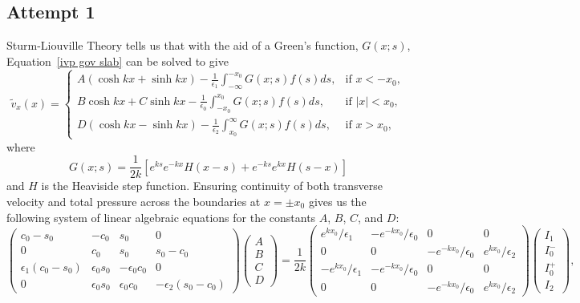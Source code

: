 \documentclass{aastex61}
\begin{document}
\subsection{Attempt 1}
Sturm-Liouville Theory tells us that with the aid of a Green's function, $G(x;s)$, Equation~\eqref{ivp gov slab} can be solved to give
\begin{equation}
\tilde{v}_x(x) =
\begin{cases}
A(\cosh{kx} + \sinh{kx}) - \frac{1}{\epsilon_1} \int_{-\infty}^{-x_0} G(x;s)f(s)ds, & \text{if  } x<-x_0,\\
B\cosh{kx} + C\sinh{kx} - \frac{1}{\epsilon_0} \int_{-x_0}^{x_0} G(x;s)f(s)ds, & \text{if  } |x|<x_0,\\
D(\cosh{kx} - \sinh{kx}) - \frac{1}{\epsilon_2} \int_{x_0}^{\infty} G(x;s)f(s)ds, & \text{if  } x>x_0,
\end{cases}
\label{ivp slab sol}
\end{equation}
where
\begin{equation}
G(x;s) = \frac{1}{2k}[e^{ks}e^{-kx}H(x-s) + e^{-ks}e^{kx}H(s-x)]
\end{equation}
and $H$ is the Heaviside step function. Ensuring continuity of both transverse velocity and total pressure across the boundaries at $x=\pm x_0$ gives us the following system of linear algebraic equations for the constants $A$, $B$, $C$, and $D$:
\begin{equation}
\left(
\begin{matrix}
c_0-s_0              &-c_0           &s_0              &0                   \\
0                    &c_0            &s_0              &s_0-c_0           \\
\epsilon_1(c_0-s_0)  &\epsilon_0s_0  &-\epsilon_0c_0   &0                   \\
0                    &\epsilon_0s_0  &\epsilon_0c_0    &-\epsilon_2(s_0-c_0)
\end{matrix}
\right)
\left(
\begin{matrix}
A \\
B \\
C \\
D
\end{matrix}
\right)
=
\frac{1}{2k}
\left(
\begin{matrix}
e^{kx_0}/\epsilon_1  & -e^{-kx_0}/\epsilon_0  & 0                      & 0                   \\
0                    & 0                      & -e^{-kx_0}/\epsilon_0  & e^{kx_0}/\epsilon_2 \\
-e^{kx_0}/\epsilon_1 & -e^{-kx_0}/\epsilon_0  & 0                      & 0                   \\
0                    & 0                      & -e^{-kx_0}/\epsilon_0  & e^{kx_0}/\epsilon_2
\end{matrix}
\right)
\left(
\begin{matrix}
I_1    \\
I_0^- \\
I_0^+ \\
I_2
\end{matrix}
\right),
\label{coefmatrix}
\end{equation}
\end{document}
